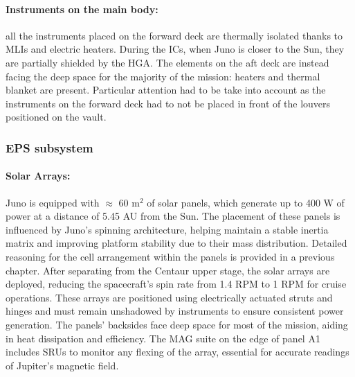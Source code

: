 \paragraph{Instruments on the main body:} all the instruments placed on the forward deck are thermally isolated thanks to MLIs and electric heaters. During the ICs, when Juno is closer to the Sun, they are partially shielded by the HGA.\cite{JADE_info}\cite{JEDI_info} The elements on the aft deck are instead facing the deep space for the majority of the mission: heaters and thermal blanket are present.\cite{Waves_info} Particular attention had to be take into account as the instruments on the forward deck had to not be placed in front of the louvers positioned on the vault. 

\subsubsection{EPS subsystem}
\label{subsubsec:eps_sub}

\vspace{-2mm}

\paragraph{Solar Arrays:} Juno is equipped with $\approx$ 60 m$^2$ of solar panels, which generate up to 400 W of power at a distance of 5.45 AU from the Sun.\cite{pannelli} The placement of these panels is influenced by Juno's spinning architecture, helping maintain a stable inertia matrix and improving platform stability due to their mass distribution.\cite{solar_panels_coef} Detailed reasoning for the cell arrangement within the panels is provided in a previous chapter. After separating from the Centaur upper stage, the solar arrays are deployed, reducing the spacecraft's spin rate from 1.4 RPM to 1 RPM for cruise operations.\cite{Juno_launch} These arrays are positioned using electrically actuated struts and hinges and must remain unshadowed by instruments to ensure consistent power generation. The panels' backsides face deep space for most of the mission, aiding in heat dissipation and efficiency. The MAG suite on the edge of panel A1 includes SRUs to monitor any flexing of the array, essential for accurate readings of Jupiter's magnetic field. 

\vspace{-4mm}

